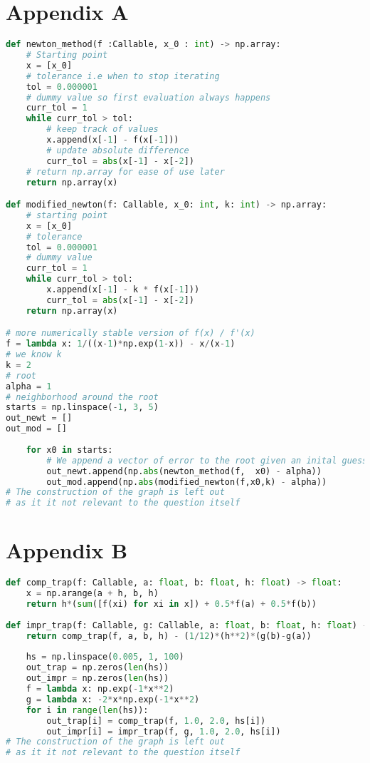 \documentclass{article}
\begin{document}
\section*{Appendix A}
\begin{lstlisting}[language=Python]
def newton_method(f :Callable, x_0 : int) -> np.array:
    # Starting point
    x = [x_0]
    # tolerance i.e when to stop iterating
    tol = 0.000001
    # dummy value so first evaluation always happens
    curr_tol = 1
    while curr_tol > tol:
        # keep track of values
        x.append(x[-1] - f(x[-1]))
        # update absolute difference
        curr_tol = abs(x[-1] - x[-2])
    # return np.array for ease of use later
    return np.array(x)

def modified_newton(f: Callable, x_0: int, k: int) -> np.array:
    # starting point
    x = [x_0]
    # tolerance
    tol = 0.000001
    # dummy value
    curr_tol = 1
    while curr_tol > tol:
        x.append(x[-1] - k * f(x[-1]))
        curr_tol = abs(x[-1] - x[-2])
    return np.array(x)

# more numerically stable version of f(x) / f'(x)
f = lambda x: 1/((x-1)*np.exp(1-x)) - x/(x-1)
# we know k
k = 2
# root
alpha = 1
# neighborhood around the root
starts = np.linspace(-1, 3, 5)
out_newt = []
out_mod = []
    
    for x0 in starts:
        # We append a vector of error to the root given an inital guess
        out_newt.append(np.abs(newton_method(f,  x0) - alpha))
        out_mod.append(np.abs(modified_newton(f,x0,k) - alpha)) 
# The construction of the graph is left out
# as it it not relevant to the question itself
\end{lstlisting}

\section*{Appendix B}
\begin{lstlisting}[language=Python]
def comp_trap(f: Callable, a: float, b: float, h: float) -> float:
    x = np.arange(a + h, b, h)
    return h*(sum([f(xi) for xi in x]) + 0.5*f(a) + 0.5*f(b))
    
def impr_trap(f: Callable, g: Callable, a: float, b: float, h: float) -> float:
    return comp_trap(f, a, b, h) - (1/12)*(h**2)*(g(b)-g(a)) 
    
    hs = np.linspace(0.005, 1, 100)
    out_trap = np.zeros(len(hs))
    out_impr = np.zeros(len(hs))
    f = lambda x: np.exp(-1*x**2)
    g = lambda x: -2*x*np.exp(-1*x**2)
    for i in range(len(hs)):
        out_trap[i] = comp_trap(f, 1.0, 2.0, hs[i])
        out_impr[i] = impr_trap(f, g, 1.0, 2.0, hs[i]) 
# The construction of the graph is left out
# as it it not relevant to the question itself
\end{lstlisting}
\end{document}
